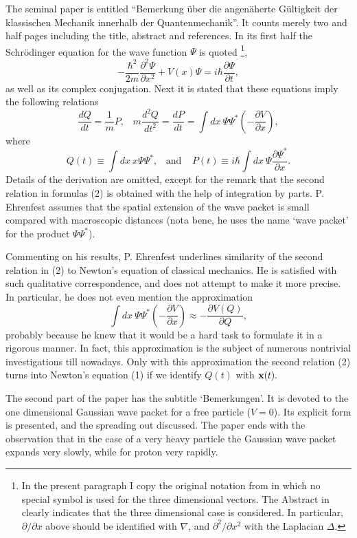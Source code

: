 \documentclass[12pt]{article}
\begin{document}
The seminal paper \cite{ehr} is entitled ``Bemerkung \"uber die angen\"aherte G\"ultigkeit der klassischen Mechanik innerhalb der Quantenmechanik''. It counts merely two and half pages including the title, abstract and references. In its first half the Schr\"odinger equation for the wave function $\Psi$ is quoted \footnote{In the present paragraph I copy the original notation from \cite{ehr} in which no special symbol is used for the three dimensional vectors. The Abstract in \cite{ehr} clearly indicates that the three dimensional case is considered. In particular, $\partial/ \partial x $ above should be identified with $\nabla$, and $\partial^2/ \partial x^2 $ with the Laplacian $\Delta$.}, 
\[ - \frac{\hbar^2}{2m} \frac{\partial^2 \Psi}{\partial x^2} + V(x) \Psi = i \hbar \frac{\partial \Psi}{\partial t}, \]
as well as its complex conjugation. 
 Next it is stated that these equations imply the following relations 
\begin{equation} \frac{d Q}{dt} = \frac{1}{m} P, \;\;\; m \frac{d^2 Q}{dt^2} = \frac{d P}{dt}= \int \! dx \:\Psi \Psi^* (- \frac{\partial V}{\partial x}), \end{equation}
where \[Q(t) \equiv \int\! dx \: x \Psi \Psi^*, \;\;\;\mbox{and} \;\;\;\; P(t) \equiv i \hbar \int \! dx \:\Psi \frac {\partial \Psi^* }{\partial x}. \]
Details of the derivation are omitted, except for the remark that the second relation in formulas (2) is obtained with the help of integration by parts. P. Ehrenfest assumes that the spatial extension of the wave packet is small compared with macroscopic distances 
(nota bene, he uses the name `wave packet' for the product $\Psi \Psi^*$). 

Commenting on his results, P. Ehrenfest underlines similarity of the second relation in (2) to Newton's equation of classical mechanics. He is satisfied with such qualitative correspondence, and does not attempt to make it more precise. In particular, he does not even mention the approximation
\[ \int \! dx \:\Psi \Psi^* (- \frac{\partial V}{\partial x}) \approx - \frac{\partial V(Q)}{\partial Q}, \]
probably because he knew that it would be a hard task to formulate it in a rigorous manner. In fact, this approximation is the subject of numerous nontrivial investigations till nowadays. Only with this approximation the second relation (2) turns into Newton's equation (1) 
if we identify $ Q(t)$ with ${\bf x}(t).$ 


The second part of the paper has the subtitle `Bemerkungen'. It is devoted to the one dimensional Gaussian wave packet for a free particle ($V=0$). Its explicit form is presented, and the spreading out discussed. The paper ends with the observation that in the case of a very heavy particle the Gaussian wave packet expands very slowly, while for proton very rapidly. 
\end{document}
